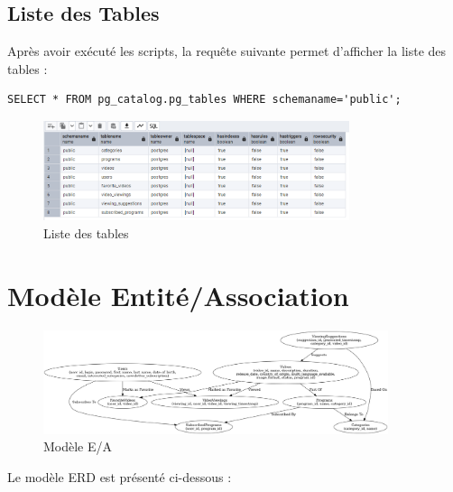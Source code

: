 \documentclass[a4paper,12pt]{article}
\begin{document}
\subsection{Liste des Tables}

Après avoir exécuté les scripts, la requête suivante permet d'afficher la liste des tables :

\begin{lstlisting}
SELECT * FROM pg_catalog.pg_tables WHERE schemaname='public';
\end{lstlisting}

\begin{figure}[h!]
    \centering
    \includegraphics[width=0.8\textwidth]{photo1.jpg}
    \caption{Liste des tables}
\end{figure}

\section{Modèle Entité/Association}

\begin{figure}[h!]
    \centering
    \includegraphics[width=0.9\textwidth]{photo2.jpg}
    \caption{Modèle E/A}
\end{figure}

Le modèle ERD est présenté ci-dessous :
\end{document}
